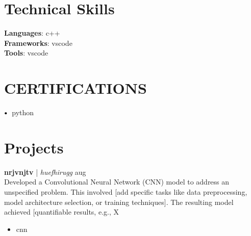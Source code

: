 \documentclass[letterpaper,11pt]{article}
\newcommand\sbullet[1][.5]{\mathbin{\vcenter{\hbox{\scalebox{#1}{$\bullet$}}}}}
\begin{document}
\section*{Technical Skills}
\textbf{Languages}: c++ \\[4pt]
\textbf{Frameworks}: vscode \\[4pt]
\textbf{Tools}: vscode \\[4pt]




%     

\section{CERTIFICATIONS}
$\sbullet[.75] \hspace{0.1cm}$ python \\

\section*{Projects}
\textbf{nrjvnjtv} \href{efuhgouthg}{\faExternalLink} | \textit{huefhirugg} \hfill aug \\[2pt]
Developed a Convolutional Neural Network (CNN) model to address an unspecified problem.  This involved [add specific tasks like data preprocessing, model architecture selection, or training techniques].  The resulting model achieved [quantifiable results, e.g., X%
\begin{itemize}[leftmargin=*]
\item cnn
\end{itemize}
\end{document}
